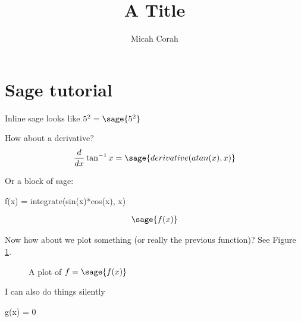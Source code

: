 \documentclass{article}
\title{A Title}
\author{Micah Corah}
\begin{document}
\maketitle

\section{Sage tutorial}
Inline sage looks like $5^2=\sage{5^2}$

How about a derivative?
\begin{align}
  \frac{d}{dx}\tan^{-1}x = \sage{derivative(atan(x),x)}
\end{align}

Or a block of sage:
\begin{sageblock}
  f(x) = integrate(sin(x)*cos(x), x)
\end{sageblock}
\begin{align}
  \sage{f(x)}
\end{align}

Now how about we plot something (or really the previous function)?
See Figure \ref{fig:sage}.\\

\begin{figure}
  \centerline{  }
  \caption{A plot of $f=\protect\sage{f(x)}$}
  \label{fig:sage}
\end{figure}

I can also do things silently
\begin{sagesilent}
  g(x) = 0
\end{sagesilent}
\end{document}
